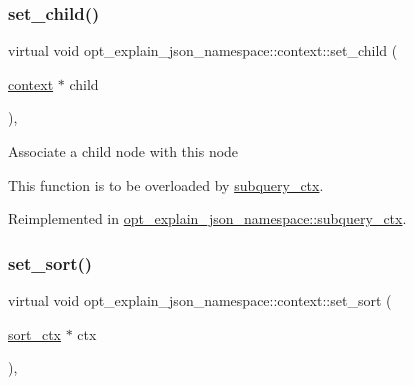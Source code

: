 \mbox{\label{classopt__explain__json__namespace_1_1context_a16f5a188524441f0bf60b88edc779fa6}} 
\subsubsection{\texorpdfstring{set\+\_\+child()}{set\_child()}}
{\footnotesize\ttfamily virtual void opt\+\_\+explain\+\_\+json\+\_\+namespace\+::context\+::set\+\_\+child (\begin{DoxyParamCaption}\item[{\mbox{\hyperlink{classopt__explain__json__namespace_1_1context}{context}} $\ast$}]{child }\end{DoxyParamCaption})\hspace{0.3cm}{\ttfamily [inline]}, {\ttfamily [virtual]}}

Associate a child node with this node

This function is to be overloaded by \mbox{\hyperlink{classopt__explain__json__namespace_1_1subquery__ctx}{subquery\+\_\+ctx}}. 

Reimplemented in \mbox{\hyperlink{classopt__explain__json__namespace_1_1subquery__ctx_aa096e69d58d2c6a241e66619bd23f891}{opt\+\_\+explain\+\_\+json\+\_\+namespace\+::subquery\+\_\+ctx}}.

\mbox{\label{classopt__explain__json__namespace_1_1context_ad2ea8a178f9b0faacf2d76a43447048f}} 
\subsubsection{\texorpdfstring{set\+\_\+sort()}{set\_sort()}}
{\footnotesize\ttfamily virtual void opt\+\_\+explain\+\_\+json\+\_\+namespace\+::context\+::set\+\_\+sort (\begin{DoxyParamCaption}\item[{\mbox{\hyperlink{classopt__explain__json__namespace_1_1sort__ctx}{sort\+\_\+ctx}} $\ast$}]{ctx }\end{DoxyParamCaption})\hspace{0.3cm}{\ttfamily [inline]}, {\ttfamily [virtual]}}

